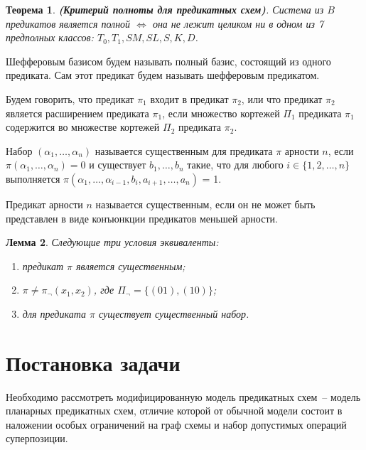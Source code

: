 \documentclass[12pt]{extarticle}
\newtheorem{theorem}{Теорема}[section]
\newtheorem{lemma}[theorem]{Лемма}
\newenvironment{definition}[1][Определение.]{\begin{trivlist}
\item[\hskip \labelsep {\bfseries #1}]}{\end{trivlist}}
\begin{document}
\begin{theorem}
\label{Post}
\textbf{(Критерий полноты для предикатных схем)}. Система из $B$ предикатов является полной $\iff$
она не лежит целиком ни в одном из 7 предполных классов: $T_0, T_1, SM, SL, S, K, D$. \cite{Shu11} 
\end{theorem}

\begin{definition}
Шефферовым базисом будем называть полный базис, состоящий из одного предиката. Сам этот предикат
будем называть шефферовым предикатом.
\end{definition}


\begin{definition}
Будем говорить, что предикат $\pi_1$ входит в предикат $\pi_2$, или что предикат $\pi_2$ является
расширением предиката $\pi_1$, если множество кортежей $\Pi_1$ предиката $\pi_1$ 
содержится во множестве кортежей $\Pi_2$ предиката $\pi_2$.
\end{definition}

\begin{definition}
Набор $(\alpha_1, \dots, \alpha_n)$ называется существенным для предиката $\pi$ арности $n$, если
$\pi(\alpha_1, \dots, \alpha_n) = 0$ и существует $b_1, \dots, b_n$ такие, что для любого $i \in \{ 1, 2, \dots, n\}$
выполняется 
$\pi(\alpha_1, \dots, \alpha_{i-1}, b_i, a_{i+1}, \dots, a_n)$ = 1.
\end{definition}

\begin{definition}
Предикат арности $n$ называется существенным, если он не может быть представлен в виде конъюнкции
предикатов меньшей арности.
\end{definition}

\begin{lemma}
\label{susch_lemma}
Следующие три условия эквиваленты: 
\begin{enumerate}
\item предикат $\pi$ является существенным;
\item $\pi \neq \pi_{\neg}(x_1, x_2)$, где $\Pi_{\neg} = \{ (01), (10) \}$;
\item для предиката $\pi$ существует существенный набор. \cite{Zhuk}
\end{enumerate}
\end{lemma}

\clearpage

\section{Постановка задачи}
Необходимо рассмотреть модифицированную модель предикатных схем~-- модель планарных предикатных схем, 
отличие которой от обычной модели состоит в наложении особых ограничений на граф схемы и набор допустимых операций 
суперпозиции. 
\end{document}
